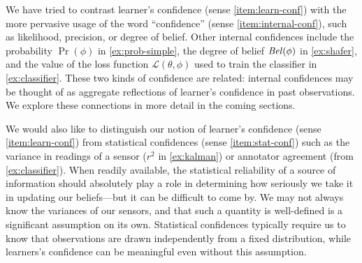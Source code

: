 We have tried to contrast learner's confidence (sense \ref{item:learn-conf})
with the more pervasive usage of the word ``confidence'' (sense \ref{item:internal-conf}),
such as likelihood, precision, or degree of belief.
Other internal confidences
        include the probability $\Pr(\phi)$ in
        \cref{ex:prob-simple}, the degree
        of belief $\mathit{Bel}(\phi)$ in \cref{ex:shafer},
        and the value of the loss function $\mathcal L(\theta,\phi)$
        used to train the classifier in \cref{ex:classifier}.
These two kinds of confidence are related:
    internal confidences may be thought of as aggregate
    reflections of learner's confidence in past observations.
We explore these connections in more detail in the coming sections.


We would also like to distinguish our notion of 
	learner's confidence (sense \ref{item:learn-conf})
    from statistical confidences
    (sense \ref{item:stat-conf})
    such as the variance in readings
    of a sensor ($r^2$ in \ref{ex:kalman})
    or annotator agreement (from \cref{ex:classifier}).
When readily available,
    the statistical reliability of a source of information
    should absolutely play a role in determining how seriously we take
    it in updating our beliefs---but it can be difficult to come by.
We may not always know the variances of our sensors, and that such a quantity is well-defined is a significant assumption on its own.  Statistical confidences typically require us to know that observations are drawn independently from a fixed distribution, while learners's confidence can be meaningful even without this assumption.



